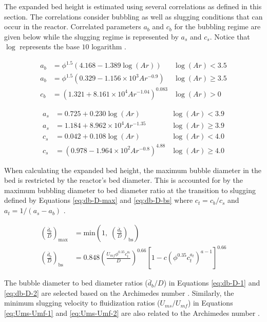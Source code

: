 \documentclass[12pt,titlepage]{article}
\begin{document}
The expanded bed height is estimated using several correlations as defined in this section. The correlations consider bubbling as well as slugging conditions that can occur in the reactor. Correlated parameters $a_b$ and $c_b$ for the bubbling regime are given below while the slugging regime is represented by $a_s$ and $c_s$. Notice that $\log$ represents the base $10$ logarithm \cite{Agu-2018}.

\begin{align}
    a_b &= \phi^{1.5} (4.168 - 1.389 \log(Ar))            & \log(Ar) < 3.5 \\
    a_b &= \phi^{1.5} (0.329 - 1.156\times10^3 Ar^{-0.9}) & \log(Ar) \geq 3.5\\
    c_b &= (1.321 + 8.161\times10^4 Ar^{-1.04})^{0.083}   & \log(Ar) > 0
\end{align}

\begin{align}
    a_s &= 0.725 + 0.230 \log(Ar)                     & \log(Ar) < 3.9 \\
    a_s &= 1.184 + 8.962\times10^4 Ar^{-1.35}         & \log(Ar) \geq 3.9 \\
    c_s &= 0.042 + 0.108 \log(Ar)                     & \log(Ar) < 4.0 \\
    c_s &= (0.978 - 1.964\times10^2 Ar^{-0.8})^{4.88} & \log(Ar) \geq 4.0
\end{align}

When calculating the expanded bed height, the maximum bubble diameter in the bed is restricted by the reactor's bed diameter. This is accounted for by the maximum bubbling diameter to bed diameter ratio at the transition to slugging defined by Equations \ref{eq:db-D-max} and \ref{eq:db-D-bs} where $c_t = c_b / c_s$ and $a_t = 1 / (a_s - a_b)$ \cite{Agu-2019g}.

\begin{align}
    \left( \frac{\overline{d}_b}{D} \right)_\text{max} &= \text{min} \left(1,\; \left( \frac{\overline{d}_b}{D} \right)_\text{bs} \right) \label{eq:db-D-max} \\
    \left( \frac{\overline{d}_b}{D} \right)_\text{bs} &= 0.848 \left( \frac{U_{mf} \phi^{0.35} c_t^{a_t}}{D} \right)^{0.66} \left[ 1 - c (\phi^{0.35} c_t^{a_t})^{a-1} \right]^{0.66} \label{eq:db-D-bs}
\end{align}

The bubble diameter to bed diameter ratios ($\overline{d}_b/D$) in Equations \ref{eq:db-D-1} and \ref{eq:db-D-2} are selected based on the Archimedes number \cite{Agu-2019a, Werther-1974}. Similarly, the minimum slugging velocity to fluidization ratios ($U_{ms}/U_{mf}$) in Equations \ref{eq:Ums-Umf-1} and \ref{eq:Ums-Umf-2} are also related to the Archimedes number \cite{Agu-2018, Shaul-2012}.
\end{document}
